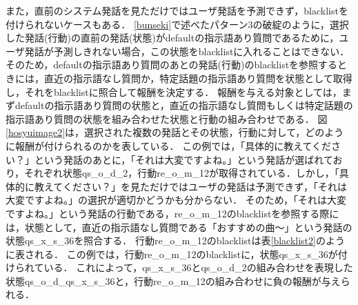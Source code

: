\documentclass[12pt,a4paper,twoside,openany]{jbook}
\begin{document}
また，直前のシステム発話を見ただけではユーザ発話を予測できず，blacklistを付けられないケースもある．
\ref{bunseki}で述べたパターン3の破綻のように，選択した発話(行動)の直前の発話(状態)がdefaultの指示語あり質問であるために，ユーザ発話が予測しきれない場合，この状態をblacklistに入れることはできない．
そのため，defaultの指示語あり質問のあとの発話(行動)のblacklistを参照するときには，直近の指示語なし質問か，特定話題の指示語あり質問を状態として取得し，それをblacklistに照合して報酬を決定する．
報酬を与える対象としては，まずdefaultの指示語あり質問の状態と，直近の指示語なし質問もしくは特定話題の指示語あり質問の状態を組み合わせた状態と行動の組み合わせである．
図\ref{hosyuimage2}は，選択された複数の発話とその状態，行動に対して，どのように報酬が付けられるのかを表している．
この例では，「具体的に教えてください？」という発話のあとに，「それは大変ですよね。」という発話が選ばれており，それぞれ状態qs\_o\_d\_2，行動re\_o\_m\_12が取得されている．しかし，「具体的に教えてください？」を見ただけではユーザの発話は予測できず，「それは大変ですよね。」の選択が適切かどうかも分からない．
そのため，「それは大変ですよね。」という発話の行動である，re\_o\_m\_12のblacklistを参照する際には，状態として，直近の指示語なし質問である「おすすめの曲～」という発話の状態qs\_x\_s\_36を照合する．
行動re\_o\_m\_12のblacklistは表\ref{blacklist2}のように表される．
この例では，行動re\_o\_m\_12のblacklistに，状態qs\_x\_s\_36が付けられている．
これによって，qs\_x\_s\_36とqs\_o\_d\_2の組み合わせを表現した状態qs\_o\_d\_qs\_x\_s\_36と，行動re\_o\_m\_12の組み合わせに負の報酬が与えられる．
\end{document}
